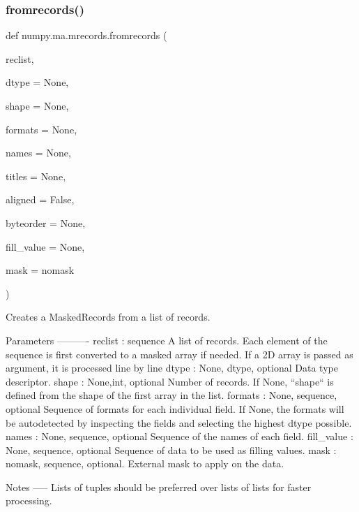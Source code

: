 \subsubsection{\texorpdfstring{fromrecords()}{fromrecords()}}
{\footnotesize\ttfamily def numpy.\+ma.\+mrecords.\+fromrecords (\begin{DoxyParamCaption}\item[{}]{reclist,  }\item[{}]{dtype = {\ttfamily None},  }\item[{}]{shape = {\ttfamily None},  }\item[{}]{formats = {\ttfamily None},  }\item[{}]{names = {\ttfamily None},  }\item[{}]{titles = {\ttfamily None},  }\item[{}]{aligned = {\ttfamily False},  }\item[{}]{byteorder = {\ttfamily None},  }\item[{}]{fill\+\_\+value = {\ttfamily None},  }\item[{}]{mask = {\ttfamily nomask} }\end{DoxyParamCaption})}

\begin{DoxyVerb}Creates a MaskedRecords from a list of records.

Parameters
----------
reclist : sequence
    A list of records. Each element of the sequence is first converted
    to a masked array if needed. If a 2D array is passed as argument, it is
    processed line by line
dtype : {None, dtype}, optional
    Data type descriptor.
shape : {None,int}, optional
    Number of records. If None, ``shape`` is defined from the shape of the
    first array in the list.
formats : {None, sequence}, optional
    Sequence of formats for each individual field. If None, the formats will
    be autodetected by inspecting the fields and selecting the highest dtype
    possible.
names : {None, sequence}, optional
    Sequence of the names of each field.
fill_value : {None, sequence}, optional
    Sequence of data to be used as filling values.
mask : {nomask, sequence}, optional.
    External mask to apply on the data.

Notes
-----
Lists of tuples should be preferred over lists of lists for faster processing.\end{DoxyVerb}
 \mbox{\label{namespacenumpy_1_1ma_1_1mrecords_a839888b6e8c0caf880133c2b18f257ca}} 
